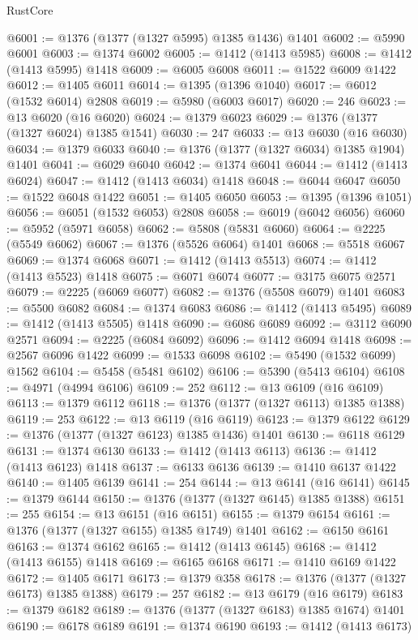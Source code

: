 \begin{lexlean}{RustCore}
\begin{coremodule}
@6001 := @1376 (@1377 (@1327 @5995) @1385 @1436) @1401
@6002 := @5990 @6001
@6003 := @1374 @6002
@6005 := @1412 (@1413 @5985)
@6008 := @1412 (@1413 @5995) @1418
@6009 := @6005 @6008
@6011 := @1522 @6009 @1422
@6012 := @1405 @6011
@6014 := @1395 (@1396 @1040)
@6017 := @6012 (@1532 @6014) @2808
@6019 := @5980 (@6003 @6017)
@6020 := 246
@6023 := @13 @6020 (@16 @6020)
@6024 := @1379 @6023
@6029 := @1376 (@1377 (@1327 @6024) @1385 @1541)
@6030 := 247
@6033 := @13 @6030 (@16 @6030)
@6034 := @1379 @6033
@6040 := @1376 (@1377 (@1327 @6034) @1385 @1904) @1401
@6041 := @6029 @6040
@6042 := @1374 @6041
@6044 := @1412 (@1413 @6024)
@6047 := @1412 (@1413 @6034) @1418
@6048 := @6044 @6047
@6050 := @1522 @6048 @1422
@6051 := @1405 @6050
@6053 := @1395 (@1396 @1051)
@6056 := @6051 (@1532 @6053) @2808
@6058 := @6019 (@6042 @6056)
@6060 := @5952 (@5971 @6058)
@6062 := @5808 (@5831 @6060)
@6064 := @2225 (@5549 @6062)
@6067 := @1376 (@5526 @6064) @1401
@6068 := @5518 @6067
@6069 := @1374 @6068
@6071 := @1412 (@1413 @5513)
@6074 := @1412 (@1413 @5523) @1418
@6075 := @6071 @6074
@6077 := @3175 @6075 @2571
@6079 := @2225 (@6069 @6077)
@6082 := @1376 (@5508 @6079) @1401
@6083 := @5500 @6082
@6084 := @1374 @6083
@6086 := @1412 (@1413 @5495)
@6089 := @1412 (@1413 @5505) @1418
@6090 := @6086 @6089
@6092 := @3112 @6090 @2571
@6094 := @2225 (@6084 @6092)
@6096 := @1412 @6094 @1418
@6098 := @2567 @6096 @1422
@6099 := @1533 @6098
@6102 := @5490 (@1532 @6099) @1562
@6104 := @5458 (@5481 @6102)
@6106 := @5390 (@5413 @6104)
@6108 := @4971 (@4994 @6106)
@6109 := 252
@6112 := @13 @6109 (@16 @6109)
@6113 := @1379 @6112
@6118 := @1376 (@1377 (@1327 @6113) @1385 @1388)
@6119 := 253
@6122 := @13 @6119 (@16 @6119)
@6123 := @1379 @6122
@6129 := @1376 (@1377 (@1327 @6123) @1385 @1436) @1401
@6130 := @6118 @6129
@6131 := @1374 @6130
@6133 := @1412 (@1413 @6113)
@6136 := @1412 (@1413 @6123) @1418
@6137 := @6133 @6136
@6139 := @1410 @6137 @1422
@6140 := @1405 @6139
@6141 := 254
@6144 := @13 @6141 (@16 @6141)
@6145 := @1379 @6144
@6150 := @1376 (@1377 (@1327 @6145) @1385 @1388)
@6151 := 255
@6154 := @13 @6151 (@16 @6151)
@6155 := @1379 @6154
@6161 := @1376 (@1377 (@1327 @6155) @1385 @1749) @1401
@6162 := @6150 @6161
@6163 := @1374 @6162
@6165 := @1412 (@1413 @6145)
@6168 := @1412 (@1413 @6155) @1418
@6169 := @6165 @6168
@6171 := @1410 @6169 @1422
@6172 := @1405 @6171
@6173 := @1379 @358
@6178 := @1376 (@1377 (@1327 @6173) @1385 @1388)
@6179 := 257
@6182 := @13 @6179 (@16 @6179)
@6183 := @1379 @6182
@6189 := @1376 (@1377 (@1327 @6183) @1385 @1674) @1401
@6190 := @6178 @6189
@6191 := @1374 @6190
@6193 := @1412 (@1413 @6173)

\end{coremodule}
\end{lexlean}
